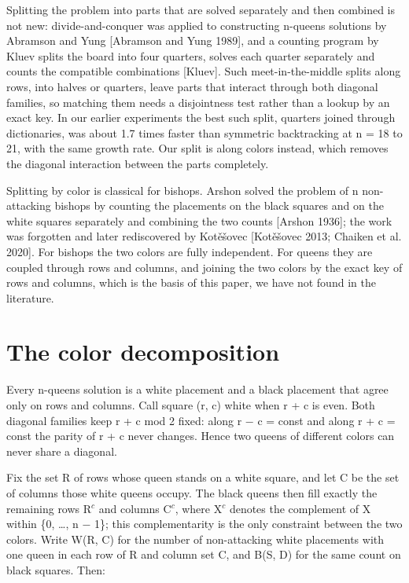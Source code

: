 Splitting the problem into parts that are solved separately and then combined is not new: divide-and-conquer was applied to constructing n-queens solutions by Abramson and Yung [Abramson and Yung 1989], and a counting program by Kluev splits the board into four quarters, solves each quarter separately and counts the compatible combinations [Kluev]. Such meet-in-the-middle splits along rows, into halves or quarters, leave parts that interact through both diagonal families, so matching them needs a disjointness test rather than a lookup by an exact key. In our earlier experiments the best such split, quarters joined through dictionaries, was about 1.7 times faster than symmetric backtracking at n = 18 to 21, with the same growth rate. Our split is along colors instead, which removes the diagonal interaction between the parts completely.

Splitting by color is classical for bishops. Arshon solved the problem of n non-attacking bishops by counting the placements on the black squares and on the white squares separately and combining the two counts [Arshon 1936]; the work was forgotten and later rediscovered by Kotěšovec [Kotěšovec 2013; Chaiken et al. 2020]. For bishops the two colors are fully independent. For queens they are coupled through rows and columns, and joining the two colors by the exact key of rows and columns, which is the basis of this paper, we have not found in the literature.

\section{The color decomposition}

Every n-queens solution is a white placement and a black placement that agree only on rows and columns. Call square (r, c) white when r + c is even. Both diagonal families keep r + c mod 2 fixed: along r − c = const and along r + c = const the parity of r + c never changes. Hence two queens of different colors can never share a diagonal.

Fix the set R of rows whose queen stands on a white square, and let C be the set of columns those white queens occupy. The black queens then fill exactly the remaining rows R$^{c}$ and columns C$^{c}$, where X$^{c}$ denotes the complement of X within \{0, …, n − 1\}; this complementarity is the only constraint between the two colors. Write W(R, C) for the number of non-attacking white placements with one queen in each row of R and column set C, and B(S, D) for the same count on black squares. Then:

